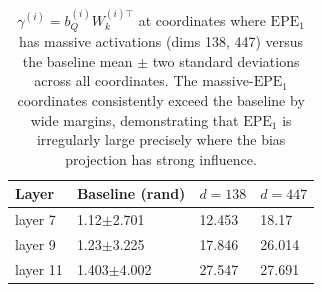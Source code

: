 \documentclass[11pt]{article}
\begin{document}
\begin{table}[t]
  \centering
  \begin{tabular}{llll}
    \hline
    \textbf{Layer} & \textbf{Baseline (rand)} & \textbf{$d{=}138$} & \textbf{$d{=}447$}\\
    \hline
    layer 7   &   1.12$\pm$2.701    &    12.453   &    18.17         \\
    layer 9   &   1.23$\pm$3.225    &    17.846   &    26.014        \\
    layer 11  &   1.403$\pm$4.002   &    27.547   &    27.691        \\
    \hline
  \end{tabular}
  \caption{$\gamma^{(i)}=b_Q^{(i)}W_k^{(i)\top}$ at coordinates where $\mathrm{EPE}_1$ has massive activations (dims 138, 447) versus the baseline mean $\pm$ two standard deviations across all coordinates. The massive-$\mathrm{EPE}_1$ coordinates consistently exceed the baseline by wide margins, demonstrating that $\mathrm{EPE}_1$ is irregularly large precisely where the bias projection has strong influence.}
  \label{obs3_table}
\end{table}
\end{document}
